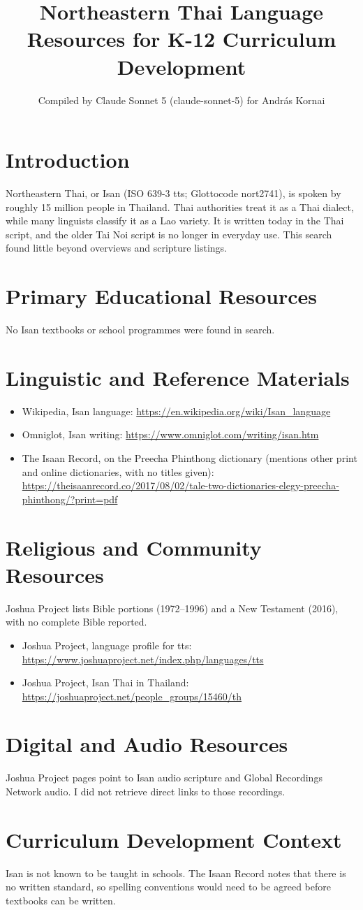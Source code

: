 \documentclass[12pt]{article}
\title{Northeastern Thai Language Resources for K-12 Curriculum Development}
\author{Compiled by Claude Sonnet 5 (claude-sonnet-5) for Andr\'as Kornai}
\date{}
\begin{document}
\maketitle
\section{Introduction}
Northeastern Thai, or Isan (ISO 639-3 tts; Glottocode nort2741), is spoken by roughly 15 million people in Thailand. Thai authorities treat it as a Thai dialect, while many linguists classify it as a Lao variety. It is written today in the Thai script, and the older Tai Noi script is no longer in everyday use. This search found little beyond overviews and scripture listings.
\section{Primary Educational Resources}
No Isan textbooks or school programmes were found in search.
\section{Linguistic and Reference Materials}
\begin{itemize}
\item Wikipedia, Isan language: \url{https://en.wikipedia.org/wiki/Isan_language}
\item Omniglot, Isan writing: \url{https://www.omniglot.com/writing/isan.htm}
\item The Isaan Record, on the Preecha Phinthong dictionary (mentions other print and online dictionaries, with no titles given): \url{https://theisaanrecord.co/2017/08/02/tale-two-dictionaries-elegy-preecha-phinthong/?print=pdf}
\end{itemize}
\section{Religious and Community Resources}
Joshua Project lists Bible portions (1972--1996) and a New Testament (2016), with no complete Bible reported.
\begin{itemize}
\item Joshua Project, language profile for tts: \url{https://www.joshuaproject.net/index.php/languages/tts}
\item Joshua Project, Isan Thai in Thailand: \url{https://joshuaproject.net/people_groups/15460/th}
\end{itemize}
\section{Digital and Audio Resources}
Joshua Project pages point to Isan audio scripture and Global Recordings Network audio. I did not retrieve direct links to those recordings.
\section{Curriculum Development Context}
Isan is not known to be taught in schools. The Isaan Record notes that there is no written standard, so spelling conventions would need to be agreed before textbooks can be written.
\end{document}
